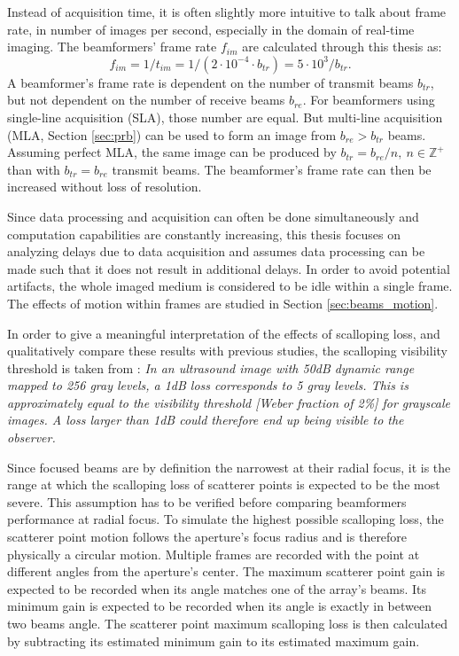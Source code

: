 Instead of acquisition time, it is often slightly more intuitive to talk about frame rate, in number of images per second, especially in the domain of real-time imaging. The beamformers' frame rate $f_{im}$ are calculated through this thesis as:
\begin{equation}
    f_{im} = 1 / t_{im} = 1 / (2 \cdot 10^{-4} \cdot b_{tr}) = 5 \cdot 10^3 / b_{tr}.
\label{eq:frame_rate}
\end{equation}
\noindent
A beamformer's frame rate is dependent on the number of transmit beams $b_{tr}$, but not dependent on the number of receive beams $b_{re}$. For beamformers using single-line acquisition (SLA), those number are equal. But multi-line acquisition (MLA, Section \ref{sec:prb}) can be used to form an image from $b_{re} > b_{tr}$ beams. Assuming perfect MLA, the same image can be produced by $b_{tr} = b_{re}/n,~n \in \mathbb{Z}^+$ than with $b_{tr} = b_{re}$ transmit beams. The beamformer's frame rate can then be increased without loss of resolution.

Since data processing and acquisition can often be done simultaneously and computation capabilities are constantly increasing, this thesis focuses on analyzing delays due to data acquisition and assumes data processing can be made such that it does not result in additional delays.
In order to avoid potential artifacts, the whole imaged medium is considered to be idle within a single frame. The effects of motion within frames are studied in Section \ref{sec:beams_motion}.

In order to give a meaningful interpretation of the effects of scalloping loss, and qualitatively compare these results with previous studies, the scalloping visibility threshold is taken from \cite{Asen_shift_invariance}: \newline
\textit{In an ultrasound image with 50dB dynamic range mapped to 256 gray levels, a 1dB loss corresponds to 5 gray levels. This is approximately equal to the visibility threshold [Weber fraction of 2\%] for grayscale images. A loss larger than 1dB could therefore end up being visible to the observer.}

Since focused beams are by definition the narrowest at their radial focus, it is the range at which the scalloping loss of scatterer points is expected to be the most severe. This assumption has to be verified before comparing beamformers performance at radial focus.
To simulate the highest possible scalloping loss, the scatterer point motion follows the aperture's focus radius and is therefore physically a circular motion. Multiple frames are recorded with the point at different angles from the aperture's center. The maximum scatterer point gain is expected to be recorded when its angle matches one of the array's beams. Its minimum gain is expected to be recorded when its angle is exactly in between two beams angle. The scatterer point maximum scalloping loss is then calculated by subtracting its estimated minimum gain to its estimated maximum gain.


